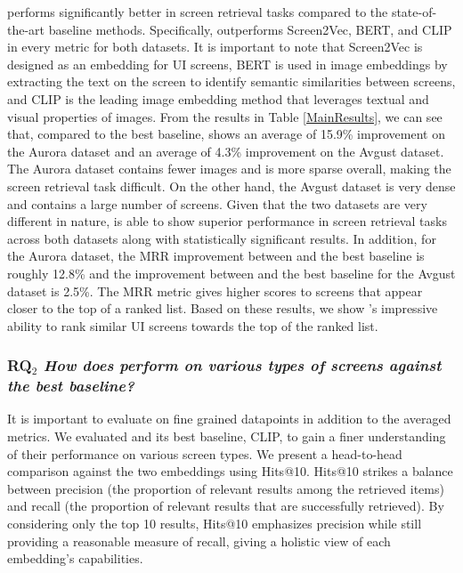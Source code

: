 

\noindent \FRAME performs significantly better in screen retrieval tasks compared to the state-of-the-art baseline methods. Specifically, \FRAME outperforms Screen2Vec, BERT, and CLIP in every metric for both datasets. It is important to note that Screen2Vec is designed as an embedding for UI screens, BERT is used in image embeddings by extracting the text on the screen to identify semantic similarities between screens, and CLIP is the leading image embedding method that leverages textual and visual properties of images. From the results in Table \ref{MainResults}, we can see that, compared to the best baseline, \FRAME shows an average of 15.9\% improvement on the Aurora dataset and an average of 4.3\% improvement on the Avgust dataset. The Aurora dataset contains fewer images and is more sparse overall, making the screen retrieval task difficult. On the other hand, the Avgust dataset is very dense and contains a large number of screens. Given that the two datasets are very different in nature, \FRAME is able to show superior performance in screen retrieval tasks across both datasets along with statistically significant results. In addition, for the Aurora dataset, the MRR improvement between \FRAME and the best baseline is roughly 12.8\% and the improvement between \FRAME and the best baseline for the Avgust dataset is 2.5\%. The MRR metric gives higher scores to screens that appear closer to the top of a ranked list. Based on these results, we show \FRAME's impressive ability to rank similar UI screens towards the top of the ranked list.





\subsubsection{\textbf{RQ$_2$} \textit{How does \FRAME perform on various types of screens against the best baseline?}}

It is important to evaluate \FRAME on fine grained datapoints in addition to the averaged metrics. We evaluated \FRAME and its best baseline, CLIP, to gain a finer understanding of their performance on various screen types. We present a head-to-head comparison against the two embeddings using Hits@10. Hits@10 strikes a balance between precision (the proportion of relevant results among the retrieved items) and recall (the proportion of relevant results that are successfully retrieved). By considering only the top 10 results, Hits@10 emphasizes precision while still providing a reasonable measure of recall, giving a holistic view of each embedding's capabilities. 

